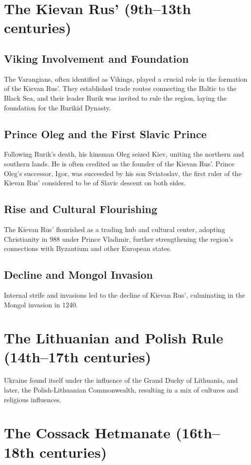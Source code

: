 \documentclass[a4paper,12pt]{book}
\begin{document}
\section{The Kievan Rus’ (9th–13th centuries)}
\label{sec:kievan-rus}
\subsection{Viking Involvement and Foundation}
The Varangians, often identified as Vikings, played a crucial role in the formation of the Kievan Rus'. They established trade routes connecting the Baltic to the Black Sea, and their leader Rurik was invited to rule the region, laying the foundation for the Rurikid Dynasty.

\subsection{Prince Oleg and the First Slavic Prince}
Following Rurik’s death, his kinsman Oleg seized Kiev, uniting the northern and southern lands. He is often credited as the founder of the Kievan Rus'. Prince Oleg's successor, Igor, was succeeded by his son Sviatoslav, the first ruler of the Kievan Rus’ considered to be of Slavic descent on both sides.

\subsection{Rise and Cultural Flourishing}
The Kievan Rus’ flourished as a trading hub and cultural center, adopting Christianity in 988 under Prince Vladimir, further strengthening the region's connections with Byzantium and other European states.

\subsection{Decline and Mongol Invasion}
Internal strife and invasions led to the decline of Kievan Rus’, culminating in the Mongol invasion in 1240.

\section{The Lithuanian and Polish Rule (14th–17th centuries)}
\label{sec:lithuanian-polish-rule}
Ukraine found itself under the influence of the Grand Duchy of Lithuania, and later, the Polish-Lithuanian Commonwealth, resulting in a mix of cultures and religious influences.

\section{The Cossack Hetmanate (16th–18th centuries)}
\label{sec:cossack-hetmanate}
\end{document}
